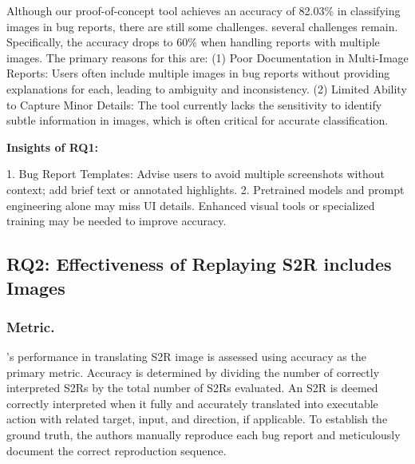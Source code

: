 Although our proof-of-concept tool achieves an accuracy of 82.03\% in classifying images in bug reports, there are still some challenges.  several challenges remain. Specifically, the accuracy drops to 60\% when handling reports with multiple images. The primary reasons for this are: (1) Poor Documentation in Multi-Image Reports: Users often include multiple images in bug reports without providing explanations for each, leading to ambiguity and inconsistency. (2) Limited Ability to Capture Minor Details: The tool currently lacks the sensitivity to identify subtle information in images, which is often critical for accurate classification.


\begin{tcolorbox}[colback=gray!15, colframe=black, ]
{\bf Insights of RQ1:}  {
%
1. Bug Report Templates: Advise users to avoid multiple screenshots without context; add brief text or annotated highlights.
%
2. Pretrained models and prompt engineering alone may miss UI details. Enhanced visual tools or specialized training may be needed to improve accuracy.

}
\end{tcolorbox}




\subsection{RQ2: Effectiveness of Replaying S2R includes Images}

\subsubsection{Metric.} \Name{}'s performance in translating S2R image is assessed using accuracy as the primary metric. Accuracy is determined by dividing the number of correctly interpreted S2Rs by the total number of S2Rs evaluated. An S2R is deemed correctly interpreted when it fully and accurately translated into executable action with related target, input, and direction, if applicable. To establish the ground truth, the authors manually reproduce each bug report and meticulously document the correct reproduction sequence.


